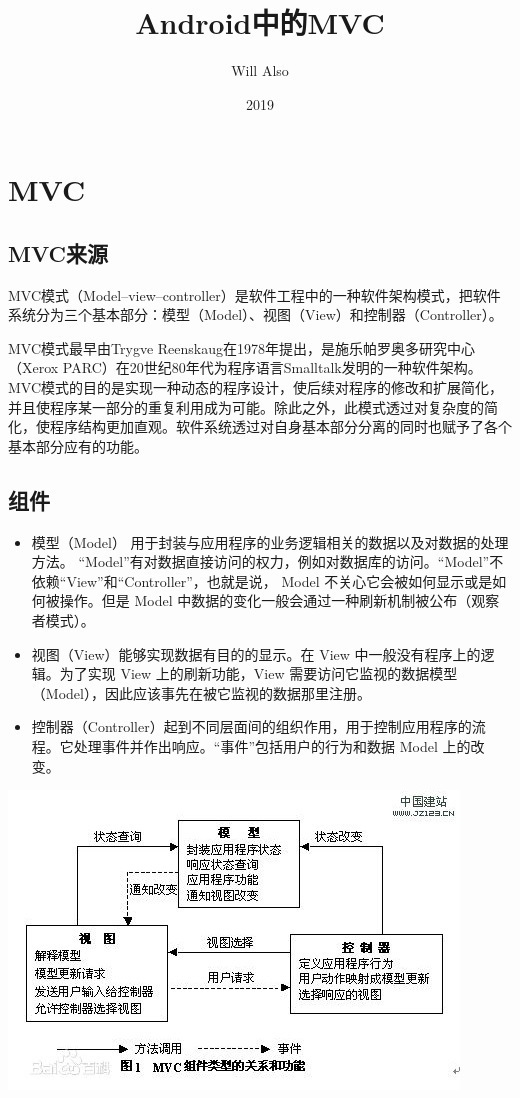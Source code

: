\documentclass[a4paper,12pt]{ctexart}
\title{Android中的MVC}
\author{Will Also}
\date{2019}
\begin{document}
	\maketitle
	\tableofcontents
	\section{MVC}
	\subsection{MVC来源}
	MVC模式（Model–view–controller）是软件工程中的一种软件架构模式，把软件系统分为三个基本部分：模型（Model）、视图（View）和控制器（Controller）。
	\par MVC模式最早由Trygve Reenskaug在1978年提出，是施乐帕罗奥多研究中心（Xerox PARC）在20世纪80年代为程序语言Smalltalk发明的一种软件架构。MVC模式的目的是实现一种动态的程序设计，使后续对程序的修改和扩展简化，并且使程序某一部分的重复利用成为可能。除此之外，此模式透过对复杂度的简化，使程序结构更加直观。软件系统透过对自身基本部分分离的同时也赋予了各个基本部分应有的功能。
	\subsection{组件}
	\begin{itemize}
		\item 模型（Model） 用于封装与应用程序的业务逻辑相关的数据以及对数据的处理方法。
		 “Model”有对数据直接访问的权力，例如对数据库的访问。“Model”不依赖“View”和“Controller”，也就是说， Model 不关心它会被如何显示或是如何被操作。但是 Model 中数据的变化一般会通过一种刷新机制被公布（观察者模式）。
		 \item 视图（View）能够实现数据有目的的显示。在 View 中一般没有程序上的逻辑。为了实现 View 上的刷新功能，View 需要访问它监视的数据模型（Model），因此应该事先在被它监视的数据那里注册。
		 \item 控制器（Controller）起到不同层面间的组织作用，用于控制应用程序的流程。它处理事件并作出响应。“事件”包括用户的行为和数据 Model 上的改变。
	\end{itemize}

		
		\includegraphics[]{image/1.png}
\end{document}
